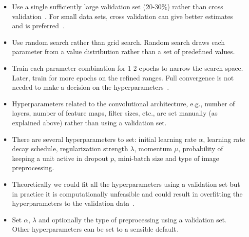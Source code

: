 \begin{itemize}

	\item Use a single sufficiently large validation set (20-30\%) rather than cross validation~\cite{Bengio2014}. For small data sets, cross validation can give better estimates and is preferred~\cite{Ng2014}.

	\item Use random search rather than grid search. Random search draws each parameter from a value distribution rather than a set of predefined values.~\cite{Bergstra2012}

	\item Train each parameter combination for 1-2 epochs to narrow the search space. Later, train for more epochs on the refined ranges. Full convergence is not needed to make a decision on the hyperparameters~\cite{Karpathy2015}.


	\item Hyperparameters related to the convolutional architecture, e.g., number of layers, number of feature maps, filter sizes, etc., are set manually (as explained above) rather than using a validation set.

	\item There are several hyperparameters to set: initial learning rate $\alpha$, learning rate decay schedule, regularization strength $\lambda$, momentum $\mu$, probability of keeping a unit active in dropout $p$, mini-batch size and type of image preprocessing.

	\item Theoretically we could fit all the hyperparameters using a validation set but in practice it is computationally unfeasible and could result in overfitting the hyperparameters to the validation data~\cite{Cawley2010}.

	\item Set $\alpha$, $\lambda$ and optionally the type of preprocessing using a validation set. Other hyperparameters can be set to a sensible default. 


\end{itemize}
